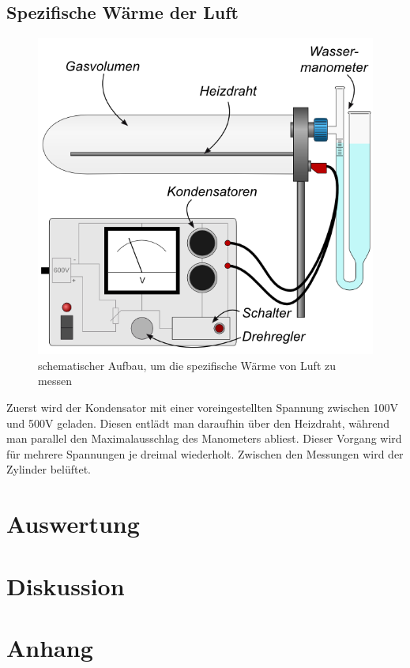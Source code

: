 \documentclass[12pt,a4paper,titlepage,headinclude,bibtotoc]{scrartcl}
\begin{document}
\subsection{Spezifische Wärme der Luft}
\begin{figure}[!htb]
 \centering
 \includegraphics{SpezWaermeSkizze.jpg}
 \caption{schematischer Aufbau, um die spezifische Wärme von Luft zu messen \cite{lp}}
 \label{fig:SWLSkizze}
\end{figure}
Zuerst wird der Kondensator mit einer voreingestellten Spannung zwischen 100V und 500V geladen.
Diesen entlädt man daraufhin über den Heizdraht, während man parallel den Maximalausschlag des Manometers abliest.
Dieser Vorgang wird für mehrere Spannungen je dreimal wiederholt.
Zwischen den Messungen wird der Zylinder belüftet.

\section{Auswertung}
\label{sec:auswertung}


\section{Diskussion}
\label{sec:diskussion}

\section{Anhang}
\end{document}
